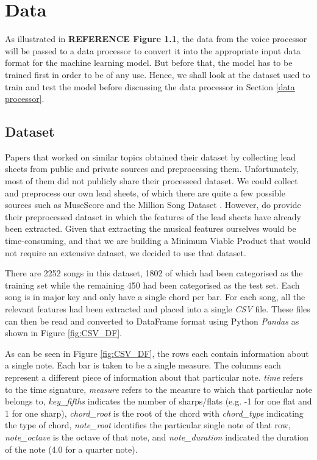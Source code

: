 
\chapter{Data} %

\label{Chapter3} %

As illustrated in \textbf{REFERENCE Figure 1.1}, the data from the voice processor will be passed to a data processor to convert it into the appropriate input data format for the machine learning model. But before that, the model has to be trained first in order to be of any use. Hence, we shall look at the dataset used to train and test the model before discussing the data processor in Section \ref{data processor}.

\section{Dataset}
Papers that worked on similar topics \cite{MySong} \cite{BLSTM} \cite{MLForChords} obtained their dataset by collecting lead sheets from public and private sources and preprocessing them. Unfortunately, most of them did not publicly share their processeed dataset. We could collect and preprocess our own lead sheets, of which there are quite a few possible sources such as MuseScore and the Million Song Dataset \cite{Bertin-Mahieux2011}. However, \cite{BLSTM} do provide their preprocessed dataset in which the features of the lead sheets have already been extracted. Given that extracting the musical features ourselves would be time-consuming, and that we are building a Minimum Viable Product that would not require an extensive dataset, we decided to use that dataset.

There are 2252 songs in this dataset, 1802 of which had been categorised as the training set while the remaining 450 had been categorised as the test set. Each song is in major key and only have a single chord per bar. For each song, all the relevant features had been extracted and placed into a single \emph{CSV} file. These files can then be read and converted to DataFrame format using Python \emph{Pandas} as shown in Figure \ref{fig:CSV_DF}.

As can be seen in Figure \ref{fig:CSV_DF}, the rows each contain information about a single note. Each bar is taken to be a single measure. The columns each represent a different piece of information about that particular note. \emph{time} refers to the time signature, \emph{measure} refers to the measure to which that particular note belongs to, \emph{key\_fifths} indicates the number of sharps/flats (e.g. -1 for one flat and 1 for one sharp), \emph{chord\_root} is the root of the chord with \emph{chord\_type} indicating the type of chord, \emph{note\_root} identifies the particular single note of that row, \emph{note\_octave} is the octave of that note, and \emph{note\_duration} indicated the duration of the note (4.0 for a quarter note).

